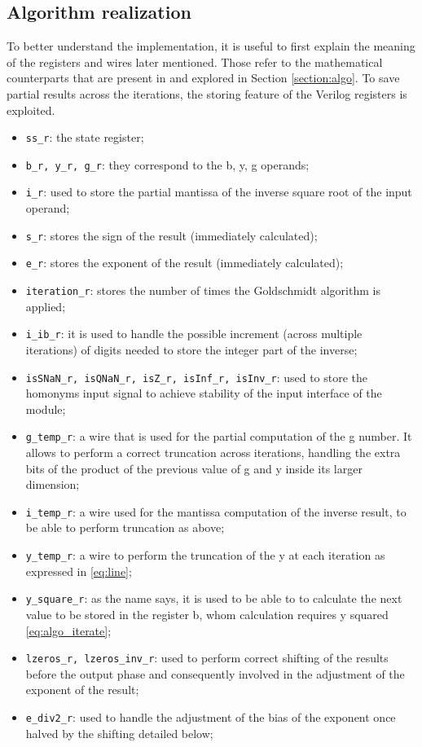 \documentclass[paper=letter, fontsize=12pt]{article}
\begin{document}
\subsection{Algorithm realization}
To better understand the implementation, it is useful to first explain the meaning of the registers and wires later mentioned. Those refer to the mathematical counterparts that are present in \cite{markstein2004software} and explored in Section \ref{section:algo}. To save partial results across the iterations, the storing feature of the Verilog registers is exploited.
\begin{itemize}
    \item \texttt{ss\_r}: the state register;
    \item \texttt{b\_r, y\_r,  g\_r}: they correspond to the b, y, g operands;
    \item \texttt{i\_r}: used to store the partial mantissa of the inverse square root of the input operand;
    \item \texttt{s\_r}: stores the sign of the result (immediately calculated);
    \item \texttt{e\_r}: stores the exponent of the result (immediately calculated);
    \item \texttt{iteration\_r}: stores the number of times the Goldschmidt algorithm is applied;
    \item \texttt{i\_ib\_r}: it is used to handle the possible increment (across multiple iterations) of digits needed to store the integer part of the inverse;
    \item \texttt{isSNaN\_r, isQNaN\_r, isZ\_r, isInf\_r, isInv\_r}: used to store the homonyms input signal to achieve stability of the input interface of the module;
    \item \texttt{g\_temp\_r}: a wire that is used for the partial computation of the g number. It allows to perform a correct truncation across iterations, handling the extra bits of the product of the previous value of g and y inside its larger dimension;
    \item \texttt{i\_temp\_r}: a wire used for the mantissa computation of the inverse result, to be able to perform truncation as above;
    \item \texttt{y\_temp\_r}: a wire to perform the truncation of the y at each iteration as expressed in \ref{eq:line};
    \item \texttt{y\_square\_r}: as the name says, it is used to be able to to calculate the next value to be stored in the register b, whom calculation requires y squared \ref{eq:algo_iterate};
    \item \texttt{lzeros\_r, lzeros\_inv\_r}: used to perform correct shifting of the results before the output phase and consequently involved in the adjustment of the exponent of the result;
    \item \texttt{e\_div2\_r}: used to handle the adjustment of the bias of the exponent once halved by the shifting detailed below;
\end{itemize} 
\end{document}

